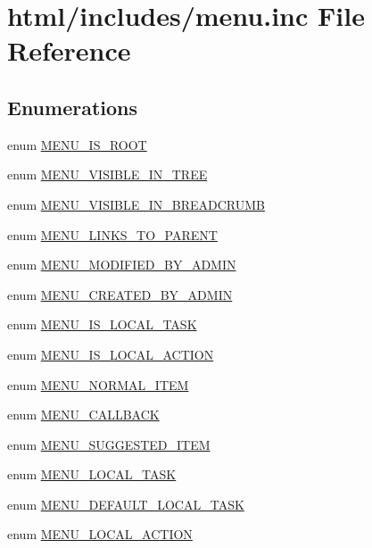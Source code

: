 \hypertarget{includes_2menu_8inc}{
\section{html/includes/menu.inc File Reference}
\label{includes_2menu_8inc}
}
\subsection*{Enumerations}
\begin{DoxyCompactItemize}
\item 
enum \hyperlink{group__menu__flags_ga24354914e560f062f1999c2caddcb557}{MENU\_\-IS\_\-ROOT} 
\item 
enum \hyperlink{group__menu__flags_gac55f524092d03020a397d5622251de11}{MENU\_\-VISIBLE\_\-IN\_\-TREE} 
\item 
enum \hyperlink{group__menu__flags_ga401fd8a91b185414422e9258c44235c0}{MENU\_\-VISIBLE\_\-IN\_\-BREADCRUMB} 
\item 
enum \hyperlink{group__menu__flags_ga5ec2b7780807d41d9e691981976d51b1}{MENU\_\-LINKS\_\-TO\_\-PARENT} 
\item 
enum \hyperlink{group__menu__flags_ga784c1ff27202a1d2edafca310e15a0a1}{MENU\_\-MODIFIED\_\-BY\_\-ADMIN} 
\item 
enum \hyperlink{group__menu__flags_ga4e3c1ba9817162fc27cb19aeaa7d9373}{MENU\_\-CREATED\_\-BY\_\-ADMIN} 
\item 
enum \hyperlink{group__menu__flags_ga1dabe85b3ecd23eec02b20ef2d2f6259}{MENU\_\-IS\_\-LOCAL\_\-TASK} 
\item 
enum \hyperlink{group__menu__flags_ga91f0814c85a485d700a1955a00e2c0b8}{MENU\_\-IS\_\-LOCAL\_\-ACTION} 
\item 
enum \hyperlink{group__menu__item__types_gac42144282c42a943b05511b38c451e4c}{MENU\_\-NORMAL\_\-ITEM} 
\item 
enum \hyperlink{group__menu__item__types_ga92850b428279a637ce9bac5c1757700f}{MENU\_\-CALLBACK} 
\item 
enum \hyperlink{group__menu__item__types_ga0860a2534ce61dc1334dc7ede68e20b3}{MENU\_\-SUGGESTED\_\-ITEM} 
\item 
enum \hyperlink{group__menu__item__types_ga4dc67226400f237bd3c0a5ef7126008b}{MENU\_\-LOCAL\_\-TASK} 
\item 
enum \hyperlink{group__menu__item__types_ga251e324e062f2e4c703f51231c0d7dc5}{MENU\_\-DEFAULT\_\-LOCAL\_\-TASK} 
\item 
enum \hyperlink{group__menu__item__types_gac627fc26dd1719748fa8aec50300ef16}{MENU\_\-LOCAL\_\-ACTION} 

\end{DoxyCompactItemize}
